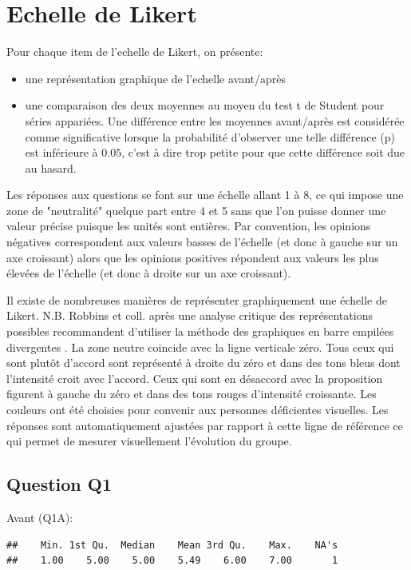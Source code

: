 \documentclass[12pt,english,french]{article}\usepackage{graphicx, color}
\makeatletter
\newenvironment{kframe}{%
 \def\at@end@of@kframe{}%
 \ifinner\ifhmode%
  \def\at@end@of@kframe{\end{minipage}}%
  \begin{minipage}{\columnwidth}%
 \fi\fi%
 \def\FrameCommand##1{\hskip\@totalleftmargin \hskip-\fboxsep
 \colorbox{shadecolor}{##1}\hskip-\fboxsep
     \hskip-\linewidth \hskip-\@totalleftmargin \hskip\columnwidth}%
 \MakeFramed {\advance\hsize-\width
   \@totalleftmargin\z@ \linewidth\hsize
   \@setminipage}}%
 {\par\unskip\endMakeFramed%
 \at@end@of@kframe}
\newenvironment{knitrout}{}{} %
\makeatother
\begin{document}
\section{Echelle de Likert}

Pour chaque item de l'echelle de Likert, on présente:
\begin{itemize}
  \item une représentation graphique de l'echelle avant/après
  \item une comparaison des deux moyennes au moyen du test t de Student pour séries appariées. Une différence entre les moyennes avant/après est considérée comme significative lorsque la probabilité d'observer une telle différence (p) est inférieure à $0.05$, c'est à dire trop petite pour que cette différence soit due au hasard.
\end{itemize}

Les réponses aux questions se font sur une échelle allant 1 à 8, ce qui impose une zone de "neutralité" quelque part entre 4 et 5 sans que l'on puisse donner une valeur précise puisque les unités sont entières. Par convention, les opinions négatives correspondent aux valeurs basses de l'échelle (et donc à gauche sur un axe croissant) alors que les opinions positives répondent aux valeurs les plus élevées de l'échelle (et donc à droite sur un axe croissant).

Il existe de nombreuses manières de représenter graphiquement une échelle de Likert. N.B. Robbins et coll. après une analyse critique des représentations possibles recommandent d'utiliser la méthode des graphiques en barre empilées divergentes \cite{1}.
La zone neutre coincide avec la ligne verticale zéro. Tous ceux qui sont plutôt d'accord sont représenté à droite du zéro et dans des tons bleus dont l'intensité croit avec l'accord. Ceux qui sont en désaccord avec la proposition figurent à gauche du zéro et dans des tons rouges d'intensité croissante. Les couleurs ont été choisies pour convenir aux personnes déficientes visuelles. Les réponses sont automatiquement ajustées par rapport à cette ligne de référence ce qui permet de mesurer visuellement l'évolution du groupe.

\subsection{Question Q1}



Avant (Q1A):
\begin{knitrout}
\color{fgcolor}\begin{kframe}
\begin{verbatim}
##    Min. 1st Qu.  Median    Mean 3rd Qu.    Max.    NA's 
##    1.00    5.00    5.00    5.49    6.00    7.00       1
\end{verbatim}
\end{kframe}
\end{knitrout}
\end{document}
